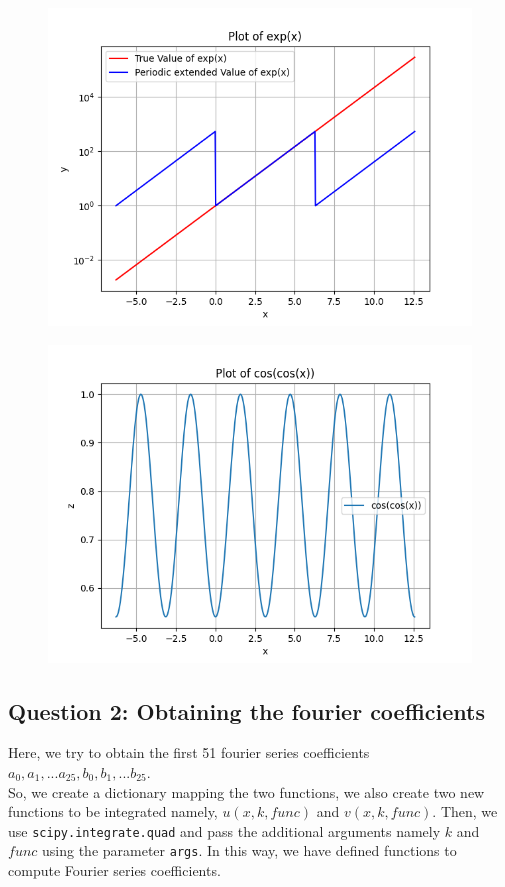 \documentclass[11pt, a4paper]{article}
\begin{document}
\begin{figure}[H]
     \centering
     \includegraphics[scale=0.8]{Figure_1.png}
\end{figure}

\begin{figure}[H]
     \centering
     \includegraphics[scale=0.8]{Figure_2.png}
\end{figure}





\subsection{Question 2: Obtaining the fourier coefficients}
Here, we try to obtain the first 51 fourier series coefficients $a_0, a_1, ... a_{25}, b_0, b_1, ...b_{25}$. \\
So, we create a dictionary mapping the two functions, we also create two new functions to be integrated namely, $u(x, k, func)$ and $v(x, k, func)$. Then, we use \texttt{scipy.integrate.quad} and pass the additional arguments namely $k$ and $func$ using the parameter \texttt{args}. In this way, we have defined functions to compute Fourier series coefficients. \\
\end{document}
